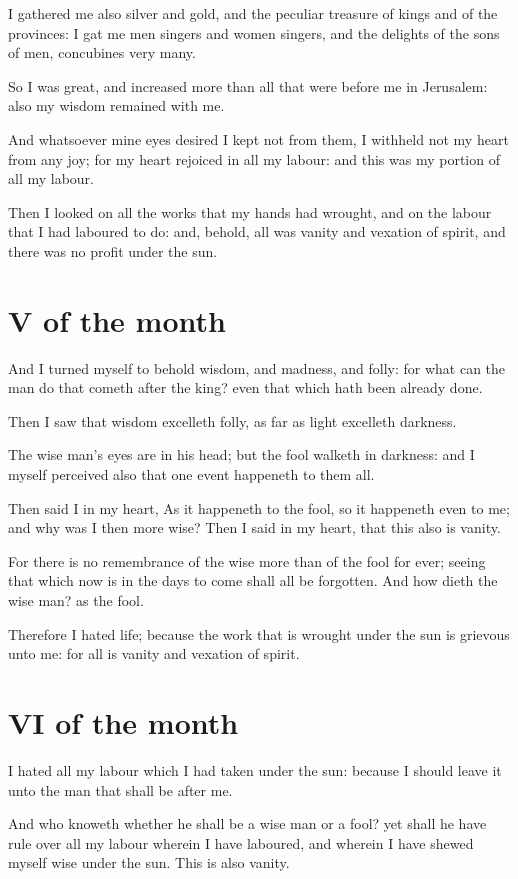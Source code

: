 \documentclass[0main.tex]{subfiles}
\begin{document}
I gathered me also silver and gold, and the peculiar treasure of kings and of the provinces: I gat me men singers and women singers, and the delights of the sons of men, concubines very many.

So I was great, and increased more than all that were before me in Jerusalem: also my wisdom remained with me.

And whatsoever mine eyes desired I kept not from them, I withheld not my heart from any joy; for my heart rejoiced in all my labour: and this was my portion of all my labour.

Then I looked on all the works that my hands had wrought, and on the labour that I had laboured to do: and, behold, all was vanity and vexation of spirit, and there was no profit under the sun.

\section*{V of the month}

And I turned myself to behold wisdom, and madness, and folly: for what can the man do that cometh after the king? even that which hath been already done.

Then I saw that wisdom excelleth folly, as far as light excelleth darkness.

The wise man's eyes are in his head; but the fool walketh in darkness: and I myself perceived also that one event happeneth to them all.

Then said I in my heart, As it happeneth to the fool, so it happeneth even to me; and why was I then more wise? Then I said in my heart, that this also is vanity.

For there is no remembrance of the wise more than of the fool for ever; seeing that which now is in the days to come shall all be forgotten. And how dieth the wise man? as the fool.

Therefore I hated life; because the work that is wrought under the sun is grievous unto me: for all is vanity and vexation of spirit.

\section*{VI of the month}

I hated all my labour which I had taken under the sun: because I should leave it unto the man that shall be after me.

And who knoweth whether he shall be a wise man or a fool? yet shall he have rule over all my labour wherein I have laboured, and wherein I have shewed myself wise under the sun. This is also vanity.
\end{document}
